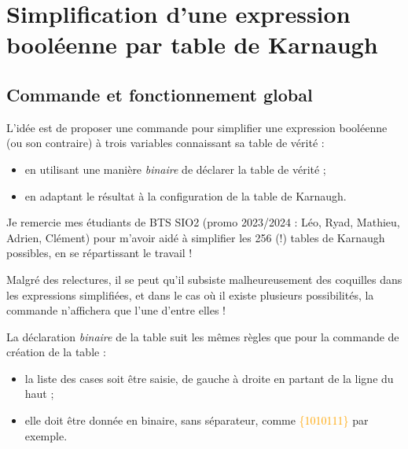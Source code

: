 \documentclass[french,a4paper,11pt]{article}
\newcommand\Cle[1]{{\small\sffamily\textlangle \textcolor{orange}{#1}\textrangle}}
\begin{document}
{{\pagebreak

\section{Simplification d'une expression booléenne par table de Karnaugh}

\subsection{Commande et fonctionnement global}

\begin{cautionblock}
L'idée est de proposer une commande pour simplifier une expression booléenne (ou son contraire) à trois variables connaissant sa table de vérité :

\begin{itemize}
	\item en utilisant une manière \textit{binaire} de déclarer la table de vérité ;
	\item en adaptant le résultat à la configuration de la table de Karnaugh.
\end{itemize}
\vspace*{-\baselineskip}\leavevmode
\end{cautionblock}

\begin{importantblock}
Je remercie mes étudiants de BTS SIO2 (promo 2023/2024 : Léo, Ryad, Mathieu, Adrien, Clément) pour m'avoir aidé à simplifier les 256 (!) tables de Karnaugh possibles, en se répartissant le travail !

\smallskip

Malgré des relectures, il se peut qu'il subsiste malheureusement des coquilles dans les expressions simplifiées, et dans le cas où il existe plusieurs possibilités, la commande n'affichera que l'une d'entre elles !
\end{importantblock}

\begin{DemoCode}
\end{DemoCode}

\begin{cautionblock}
La déclaration \textit{binaire} de la table suit les mêmes règles que pour la commande de création de la table :

\begin{itemize}
	\item la liste des cases soit être saisie, de gauche à droite en partant de la ligne du haut ;
	\item elle doit être donnée en binaire, sans séparateur, comme \Cle{\{1010111\}} par exemple.
\end{itemize}
\vspace*{-\baselineskip}\leavevmode
\end{cautionblock}

}}
\end{document}
